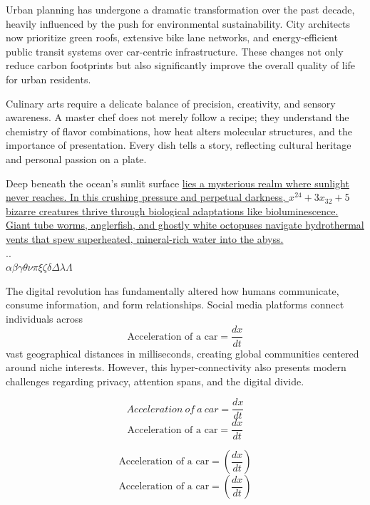 \documentclass[12pt]{report} %
\begin{document}
Urban planning has undergone a dramatic transformation over the past decade, heavily influenced by the push for environmental sustainability. City architects now prioritize green roofs, extensive bike lane networks, and energy-efficient public transit systems over car-centric infrastructure. These changes not only reduce carbon footprints but also significantly improve the overall quality of life for urban residents.

Culinary arts require a delicate balance of precision, creativity, and sensory awareness. A master chef does not merely follow a recipe; they understand the chemistry of flavor combinations, how heat alters molecular structures, and the importance of presentation. Every dish tells a story, reflecting cultural heritage and personal passion on a plate.

Deep beneath the ocean's sunlit surface \ul{lies a mysterious realm where sunlight never reaches. In this crushing pressure and perpetual darkness, $x^{24}+3x_{32}+5$ bizarre creatures thrive through biological adaptations like bioluminescence. Giant tube worms, anglerfish, and ghostly white octopuses navigate hydrothermal vents that spew superheated, mineral-rich water into the abyss.}\\
..\\
$\alpha \beta \gamma \theta \nu \pi \xi \zeta \delta \Delta \lambda \Lambda $

The digital revolution has fundamentally altered how humans communicate, consume information, and form relationships. Social media platforms connect individuals across \[\text{Acceleration of a car}=\dfrac{dx}{dt}\]vast geographical distances in milliseconds, creating global communities centered around niche interests. However, this hyper-connectivity also presents modern challenges regarding privacy, attention spans, and the digital divide.

\[Acceleration\ of\ a\ car=\dfrac{dx}{dt}\] %
\[\text{Acceleration of a car}=\dfrac{dx}{dt}\] %
\vfill

\[\text{Acceleration of a car}=(\dfrac{dx}{dt})\] %
\[\text{Acceleration of a car}=\left( \dfrac{dx}{dt}\right)\] 
\vfill
\end{document}

